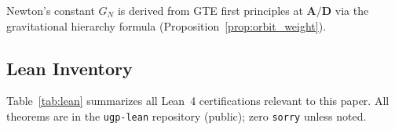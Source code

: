 \documentclass[11pt]{article}
\theoremstyle{remark}
\newcommand{\CatAD}{\textbf{A/D}}
\newcommand{\GN}{G_N}
\begin{document}
Newton's constant $\GN$ is derived from GTE first principles at $\CatAD$
via the gravitational hierarchy formula (Proposition~\ref{prop:orbit_weight}).

\begin{appendices}

\section{Lean Inventory}
\label{app:lean}

Table~\ref{tab:lean} summarizes all Lean~4 certifications relevant to this paper.
All theorems are in the \texttt{ugp-lean} repository (public); zero \texttt{sorry}
unless noted.


\end{appendices}
\end{document}
